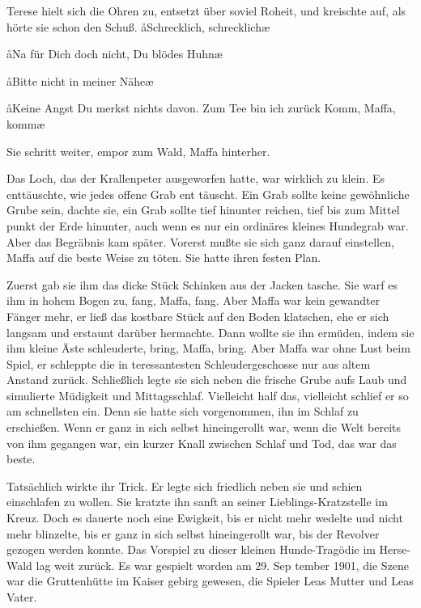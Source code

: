 Terese hielt sich die Ohren zu, entsetzt über soviel Roheit, und
kreischte auf, als hörte sie schon den Schuß. \aa{}Schrecklich,
schrecklich\ausr{}\ae{}

\aa{}Na für Dich doch nicht, Du blödes Huhn\ausr{}\ae{}

\aa{}Bitte nicht in meiner Nähe\ausr{}\ae{}

\aa{}Keine Angst\ausr{} Du merkst nichts davon. Zum Tee bin ich
zurück\punkte{} Komm, Maffa, komm\ausr{}\ae{}

Sie schritt weiter, empor zum Wald, Maffa hinterher.

Das Loch, das der Krallenpeter ausgeworfen hatte, war
wirklich zu klein. Es enttäuschte, wie jedes offene Grab ent\-%
täuscht. Ein Grab sollte keine gewöhnliche Grube sein, dachte
sie, ein Grab sollte tief hinunter reichen, tief bis zum Mittel\-%
punkt der Erde hinunter, auch wenn es nur ein ordinäres
kleines Hundegrab war. Aber das Begräbnis kam später.
Vorerst mußte sie sich ganz darauf einstellen, Maffa auf die
beste Weise zu töten. Sie hatte ihren festen Plan.

Zuerst gab sie ihm das dicke Stück Schinken aus der Jacken\-%
tasche. Sie warf es ihm in hohem Bogen zu, fang, Maffa,
fang. Aber Maffa war kein gewandter Fänger mehr, er ließ
das kostbare Stück auf den Boden klatschen, ehe er sich langsam
und erstaunt darüber hermachte. Dann wollte sie ihn ermüden,
indem sie ihm kleine Äste schleuderte, bring, Maffa, bring.
Aber Maffa war ohne Lust beim Spiel, er schleppte die in\-%
teressantesten Schleudergeschosse nur aus altem Anstand
zurück. Schließlich legte sie sich neben die frische Grube aufs
Laub und simulierte Müdigkeit und Mittagsschlaf. Vielleicht
half das, vielleicht schlief er so am schnellsten ein. Denn sie
hatte sich vorgenommen, ihn im Schlaf zu erschießen. Wenn
er ganz in sich selbst hineingerollt war, wenn die Welt bereits
von ihm gegangen war, ein kurzer Knall zwischen Schlaf und
Tod, das war das beste.

Tatsächlich wirkte ihr Trick. Er legte sich friedlich neben sie
und schien einschlafen zu wollen. Sie kratzte ihn sanft an seiner
Lieblings-Kratzstelle im Kreuz. Doch es dauerte noch eine
Ewigkeit, bis er nicht mehr wedelte und nicht mehr blinzelte,
bis er ganz in sich selbst hineingerollt war, bis der Revolver
gezogen werden konnte.
\abstand{}
Das Vorspiel zu dieser kleinen Hunde-Tragödie im Herse-%
Wald lag weit zurück. Es war gespielt worden am 29. Sep\-%
tember 1901, die Szene war die Gruttenhütte im Kaiser\-%
gebirg gewesen, die Spieler Leas Mutter und Leas Vater.


